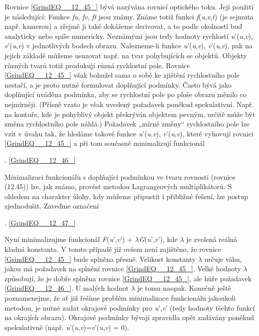 \noindent Rovnice \eqref{GrindEQ__12_45_} bývá nazývána rovnicí optického toku. Její použití je následující: Funkce \textit{fu}, \textit{fv}, \textit{ft} jsou známy. Známe totiž funkci \textit{f}(\textit{u},\textit{v},\textit{t}) (je sejmuta např. kamerou) a zřejmě ji také dokážeme derivovat, a to podle okolností buď analyticky nebo spíše numericky. Neznámými jsou tedy hodnoty rychlostí \textit{u}'(\textit{u},\textit{v}), \textit{v}'(\textit{u},\textit{v}) v jednotlivých bodech obrazu. Nalezneme-li funkce \textit{u}'(\textit{u},\textit{v}), \textit{v}'(\textit{u},\textit{v}), pak na jejich základě můžeme usuzovat např. na tvar pohybujících se objektů. Objekty různých tvarů totiž produkují různá rychlostní pole. Rovnice \eqref{GrindEQ__12_45_} však bohužel sama o sobě ke zjištění rychlostního pole nestačí, a je proto nutné formulovat doplňující podmínky. Často bývá jako doplňující uváděna podmínka, aby se rychlostní pole po ploše obrazu měnilo co nejmírněji. (Přísně vzato je však uvedený požadavek poněkud spekulativní. Např. na kontuře, kde je pohyblivý objekt překrýván objektem pevným, určitě může být změna rychlostního pole náhlá.) Požadavek „mírné změny`` rychlostního pole lze vzít v úvahu tak, že hledáme takové funkce \textit{u}'(\textit{u},\textit{v}), \textit{v}'(\textit{u},\textit{v}), které vyhovují rovnici \eqref{GrindEQ__12_45_} a při tom současně minimalizují funkcionál

 . \eqref{GrindEQ__12_46_}

\noindent Minimalizaci funkcionálu s doplňující podmínkou ve tvaru rovnosti (rovnice (12.45)) lze, jak známo, provést metodou Lagrangeových multiplikátorů. S ohledem na charakter úlohy, kdy můžeme připustit i přibližné řešení, lze postup zjednodušit. Zaveďme označení

 . \eqref{GrindEQ__12_47_}

\noindent Nyní minimalizujme funkcionál \textit{F}(\textit{u}',\textit{v}') + $\lambda$\textit{G}(\textit{u}',\textit{v}'), kde $\lambda$ je zvolená reálná kladná konstanta. V tomto případě již ovšem není zajištěno, že rovnice \eqref{GrindEQ__12_45_} bude splněna přesně. Velikost konstanty $\lambda$ určuje váhu, jakou má požadavek na splnění rovnice \eqref{GrindEQ__12_45_}. Velké hodnoty $\lambda$ způsobují, že je dobře splněna rovnice \eqref{GrindEQ__12_45_}, ale hůře požadavek \eqref{GrindEQ__12_46_}. U malých hodnot $\lambda$ je tomu naopak. Konečně ještě poznamenejme, že ať již řešíme problém minimalizace funkcionálu jakoukoli metodou, je nutné zadat okrajové podmínky pro \textit{u}',\textit{v}' (tedy hodnoty těchto funkcí na okrajích obrazu). Okrajové podmínky bývají zpravidla opět zadávány poněkud spekulativně (např. \textit{u}'(\textit{u},\textit{v})=\textit{v}'(\textit{u},\textit{v}) = 0).

